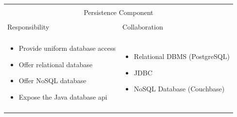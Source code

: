 \vspace{0.5cm} \noindent 
\begin{tabular}{|l|l|}
    \cline{1-2}
    \multicolumn{2}{|c|}{} \\[-0.3cm]
    \multicolumn{2}{|c|}{Persistence Component} \\ 
    \multicolumn{2}{|c|}{} \\[-0.3cm]
    \cline{1-2}
    Responsibility & Collaboration \\
    \cline{1-2}
    & \\[-0.2cm]
    \begin{minipage}{0.47\textwidth}
        \begin{itemize}
          \item Provide uniform database access
          \item Offer relational database
          \item Offer NoSQL database
          \item Expose the Java database \gls{api}
        \end{itemize} 
    \end{minipage}
	&
    \begin{minipage}{0.47\textwidth}
        \begin{itemize}
          \item Relational DBMS (PostgreSQL)
          \item JDBC
          \item NoSQL Database (Couchbase)
        \end{itemize} 
    \end{minipage}
	\\ & \\
    \hline
\end{tabular}

